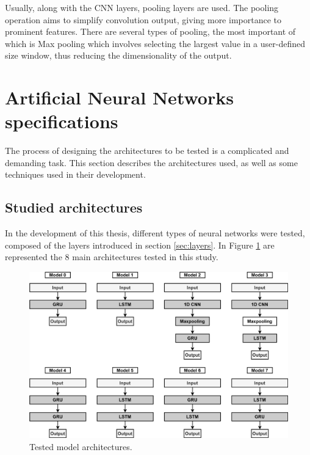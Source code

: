 Usually, along with the \ac{CNN} layers, pooling layers are used. The pooling operation aims to simplify convolution output, giving more importance to prominent features. There are several types of pooling, the most important of which is Max pooling which involves selecting the largest value in a user-defined size window, thus reducing the dimensionality of the output.

\section{Artificial Neural Networks specifications} \label{chap4:anns}

The process of designing the architectures to be tested is a complicated and demanding task. This section describes the architectures used, as well as some techniques used in their development.

\subsection{Studied architectures}\label{sec:arq}
In the development of this thesis, different types of neural networks were tested, composed of the layers introduced in section \ref{sec:layers}. In Figure \ref{models} are represented the 8 main architectures tested in this study.
\begin{figure}[h!]
    \centering
    \begin{center}
    \includegraphics[width=1\textwidth]{Images/models.png}
    \caption{Tested model architectures.}
    \label{models}
    \end{center}
\end{figure}



